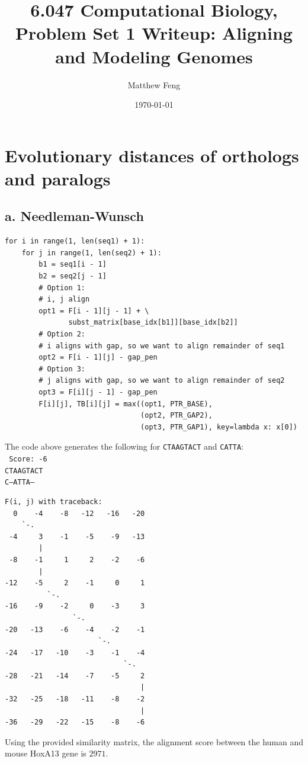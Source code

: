 \documentclass[a4paper]{article}
\title{6.047 Computational Biology, Problem Set 1 Writeup: Aligning
and Modeling Genomes}
\author{Matthew Feng}
\date{\today}
\begin{document}
\maketitle

\section{Evolutionary distances of orthologs and paralogs}
\subsection*{a. Needleman-Wunsch}

\begin{verbatim}
for i in range(1, len(seq1) + 1):
    for j in range(1, len(seq2) + 1):
        b1 = seq1[i - 1]
        b2 = seq2[j - 1]
        # Option 1:
        # i, j align
        opt1 = F[i - 1][j - 1] + \
               subst_matrix[base_idx[b1]][base_idx[b2]]
        # Option 2:
        # i aligns with gap, so we want to align remainder of seq1
        opt2 = F[i - 1][j] - gap_pen
        # Option 3:
        # j aligns with gap, so we want to align remainder of seq2
        opt3 = F[i][j - 1] - gap_pen
        F[i][j], TB[i][j] = max((opt1, PTR_BASE),
                                (opt2, PTR_GAP2),
                                (opt3, PTR_GAP1), key=lambda x: x[0])
\end{verbatim}

\noindent The code above generates the following for 
{\tt CTAAGTACT} and {\tt CATTA}:\\

{\tt
\noindent Score: -6\\
CTAAGTACT\\
C--ATTA--\\
}

\newpage
\begin{verbatim}
F(i, j) with traceback:
  0    -4    -8   -12   -16   -20
    `-.
 -4     3    -1    -5    -9   -13
        |
 -8    -1     1     2    -2    -6
        |
-12    -5     2    -1     0     1
          `-.
-16    -9    -2     0    -3     3
                `-.
-20   -13    -6    -4    -2    -1
                      `-.
-24   -17   -10    -3    -1    -4
                            `-.
-28   -21   -14    -7    -5     2
                                |
-32   -25   -18   -11    -8    -2
                                |
-36   -29   -22   -15    -8    -6
\end{verbatim}


Using the provided similarity matrix, the alignment score between
the human and mouse HoxA13 gene is $2971$.
\end{document}
